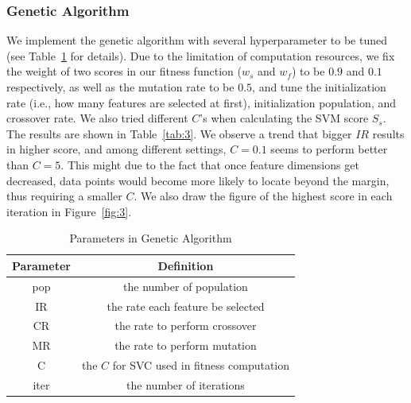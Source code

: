 \documentclass[journal]{IEEEtran}
\begin{document}
\subsubsection{Genetic Algorithm}
We implement the genetic algorithm with several hyperparameter to be tuned (see Table~\ref{tab:2} for details). Due to the limitation of computation resources, we fix the weight of two scores in our fitness function ($w_s$ and $w_f$) to be $0.9$ and $0.1$ respectively, as well as the mutation rate to be $0.5$, and tune the initialization rate (i.e., how many features are selected at first), initialization population, and crossover rate. We also tried different $C$'s when calculating the SVM score $S_s$. The results are shown in Table~\ref{tab:3}. We observe a trend that bigger $IR$ results in higher score, and among different settings, $C=0.1$ seems to perform better than $C=5$. This might due to the fact that once feature dimensions get decreased, data points would become more likely to locate beyond the margin, thus requiring a smaller $C$. We also draw the figure of the highest score in each iteration in Figure~\ref{fig:3}.
\begin{table}[htbp]
\centering
\caption{Parameters in Genetic Algorithm}
\label{tab:2}
\begin{tabular}{cc}
\toprule
Parameter&Definition \\  %
\midrule
pop&the number of population\\
IR&the rate each feature be selected\\
CR&the rate to perform crossover\\
MR&the rate to perform mutation\\
C&the $C$ for SVC used in fitness computation\\
iter&the number of iterations\\
\bottomrule
\end{tabular}
\end{table}
\end{document}
